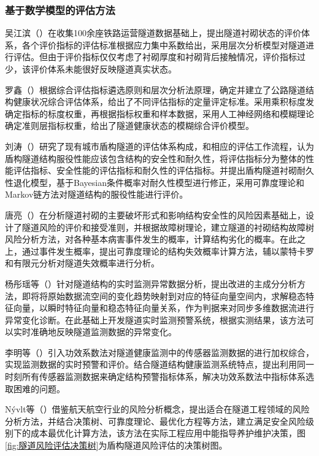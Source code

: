\subsubsection{基于数学模型的评估方法}

吴江滨（\citeyear{吴江滨2004铁路运营隧道衬砌状态评估体系的建立及工程应用研究}）在收集100余座铁路运营隧道数据基础上，提出隧道衬砌状态的评价体系，各个评价指标的评估标准根据应力集中系数给出，采用层次分析模型对隧道进行评估。但由于评价指标仅仅考虑了衬砌厚度和衬砌背后接触情况，评价指标过少，该评价体系未能很好反映隧道真实状态。

罗鑫（\citeyear{罗鑫2008公路隧道健康状态评估方法及系统研究}）根据综合评估指标遴选原则和层次分析法原理，确定并建立了公路隧道结构健康状况综合评估体系，给出了不同评估指标的定量评定标准。采用乘积标度发确定指标的标度权重，再根据指标权重和样本数据，采用人工神经网络和模糊理论确定准则层指标权重，给出了隧道健康状态的模糊综合评价模型。

刘涛（\citeyear{刘涛2008既有盾构隧道结构性能评价研究}）研究了现有城市盾构隧道的评估体系构成，和相应的评估工作流程，认为盾构隧道结构服役性能应该包含结构的安全性和耐久性，将评估指标分为整体的性能评估指标、安全性能的评估指标和耐久性的评估指标。并提出盾构隧道衬砌耐久性退化模型，基于Bayesian条件概率对耐久性模型进行修正，采用可靠度理论和Markov链方法对隧道结构的服役性能进行评价。

唐亮（\citeyear{唐亮2008隧道病害调查分析及衬砌结构的风险分析与控制研究}）在分析隧道衬砌的主要破坏形式和影响结构安全性的风险因素基础上，设计了隧道风险的评价和接受准则，并根据故障树理论，建立隧道的衬砌结构故障树风险分析方法，对各种基本病害事件发生的概率，计算结构劣化的概率。在此之上，通过事件发生概率，提出可靠度理论的结构失效概率计算方法，辅以蒙特卡罗和有限元分析对隧道失效概率进行分析。

杨彤瑶等（\citeyear{杨彤瑶2013基于改进主元分析方法的隧道应变实时监测预警系统}）针对隧道结构的实时监测异常数据分析，提出改进的主成分分析方法，即将将原始数据流空间的变化趋势映射到对应的特征向量空间内，求解稳态特征向量，以瞬时特征向量和稳态特征向量关系，作为判据来对同步多维数据流进行异常变化诊断。在此基础上开发隧道实时监测预警系统，根据实测结果，该方法可以实时准确地反映隧道监测数据的异常变化。

李明等（\citeyear{李明2015基于功效系数法的隧道结构健康监测系统预警研究}）引入功效系数法对隧道健康监测中的传感器监测数据的进行加权综合，实现监测数据的实时预警和评价。结合隧道结构健康监测系统特点，提出利用同一时刻所有传感器监测数据来确定结构预警指标体系，解决功效系数法中指标体系选取困难的问题。

Nývlt等（\citeyear{N2011Probabilistic}）借鉴航天航空行业的风险分析概念，提出适合在隧道工程领域的风险分析方法，并结合决策树、可靠度理论、最优化方程等方法，建立满足安全风险级别下的成本最优化计算方法，该方法在实际工程应用中能指导养护维护决策，图\ref{fig:隧道风险评估决策树}为盾构隧道风险评估的决策树图。

